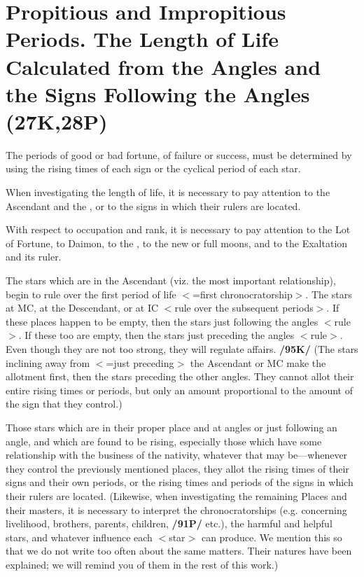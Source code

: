 \section{Propitious and Impropitious Periods. The Length of Life Calculated from the Angles and the Signs Following the Angles (27K,28P)}

The periods of good or bad fortune, of failure or success, must be determined by using the rising times of each sign or the cyclical period of each star. 

When investigating the length of life, it is necessary to pay attention to the Ascendant and the \Moon, or to the signs in which their rulers are located. 

With respect to occupation and rank, it is necessary to pay attention to the Lot of Fortune, to Daimon, to the \Sun, to the
new or full moons, and to the Exaltation and its ruler. 

The stars which are in the Ascendant (viz. the most important relationship), begin to rule over the first period of life $<$=first chronocratorship$>$. The stars at MC, at the Descendant, or at IC $<$rule over the subsequent periods$>$. If these places happen to be empty, then the stars just following the angles $<$rule$>$. If these too are empty, then the stars just preceding the angles $<$rule$>$. Even though they are not too strong, they will regulate affairs. \textbf{/95K/} (The stars inclining away from $<$=just preceding$>$ the Ascendant or MC make the allotment first, then the stars preceding the
other angles. They cannot allot their entire rising times or periods, but only an amount proportional to the amount of the sign that they control.) 

Those stars which are in their proper place and at angles or just following an angle, and which are found to be rising, especially those which have some relationship with the business of the nativity, whatever that may be—whenever they control the previously mentioned places, they allot the rising times of their signs and their own periods, or the rising times and periods of the signs in which their rulers are located. \mndl (Likewise, when investigating the remaining Places and their masters, it is necessary to interpret the chronocratorships (e.g. concerning livelihood, brothers, parents, children, \textbf{/91P/} etc.), the harmful and helpful stars, and whatever influence each $<$star$>$ can produce. We mention this so that we do not write too often about the same matters. Their natures have been explained; we will remind you of them in the rest of this work.)

